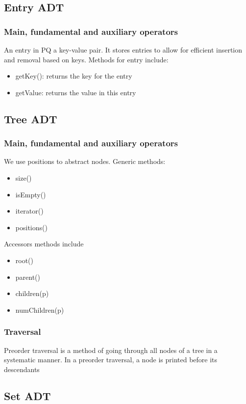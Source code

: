 \documentclass[a4paper]{article}
\theoremstyle{plain}
\theoremstyle{definition}
\theoremstyle{remark}
\begin{document}
\subsection{Entry ADT}
\subsubsection{Main, fundamental and auxiliary operators}
An entry in PQ a key-value pair. It stores entries to allow for efficient insertion and removal based on keys. Methods for entry include:
\begin{itemize}
	\item getKey(): returns the key for the entry
	\item getValue: returns the value in this entry
\end{itemize}

\subsection{Tree ADT}
\subsubsection{Main, fundamental and auxiliary operators}
We use positions to abstract nodes. Generic methods:
\begin{itemize}
	\item size()
	\item isEmpty()
	\item iterator()
	\item positions()
\end{itemize}
Accessors methods include
\begin{itemize}
	\item root()
	\item parent()
	\item children(p)
	\item numChildren(p)
\end{itemize}
\subsubsection{Traversal}
Preorder traversal is a method of going through all nodes of a tree in a systematic manner. In a preorder traversal, a node is printed before its descendants
\subsection{Set ADT}
\end{document}
